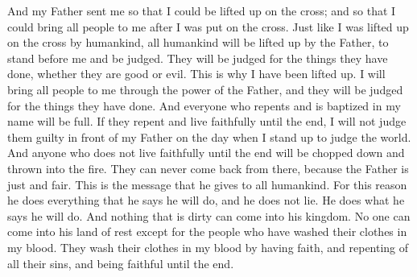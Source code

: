 And my Father sent me so that I could be lifted up on the cross; and so that I could bring all people to me after I was put on the cross. Just like I was lifted up on the cross by humankind, all humankind will be lifted up by the Father, to stand before me and be judged. They will be judged for the things they have done, whether they are good or evil.
\bverse \iffalse And for this cause have I been lifted up; therefore, according to the power of the Father I will draw all men unto me, that they may be judged according to their works. \fi
This is why I have been lifted up. I will bring all people to me through the power of the Father, and they will be judged for the things they have done.
\bverse \iffalse And it shall come to pass, that whoso repenteth and is baptized in my name shall be filled; and if he endureth to the end, behold, him will I hold guiltless before my Father at that day when I shall stand to judge the world. \fi
And everyone who repents and is baptized in my name will be full. If they repent and live faithfully until the end, I will not judge them guilty in front of my Father on the day when I stand up to judge the world.
\bverse \iffalse And he that endureth not unto the end, the same is he that is also hewn down and cast into the fire, from whence they can no more return, because of the justice of the Father. \fi
And anyone who does not live faithfully until the end will be chopped down and thrown into the fire. They can never come back from there, because the Father is just and fair.
\bverse \iffalse And this is the word which he hath given unto the children of men. And for this cause he fulfilleth the words which he hath given, and he lieth not, but fulfilleth all his words. \fi
This is the message that he gives to all humankind. For this reason he does everything that he says he will do, and he does not lie. He does what he says he will do.
\bverse \iffalse And no unclean thing can enter into his kingdom; therefore nothing entereth into his rest save it be those who have washed their garments in my blood, because of their faith, and the repentance of all their sins, and their faithfulness unto the end. \fi
And nothing that is dirty can come into his kingdom. No one can come into his land of rest except for the people who have washed their clothes in my blood. They wash their clothes in my blood by having faith, and repenting of all their sins, and being faithful until the end.
\bverse \iffalse Now this is the commandment: Repent, all ye ends of the earth, and come unto me and be baptized in my name, that ye may be sanctified by the reception of the Holy Ghost, that ye may stand spotless before me at the last day. \fi
